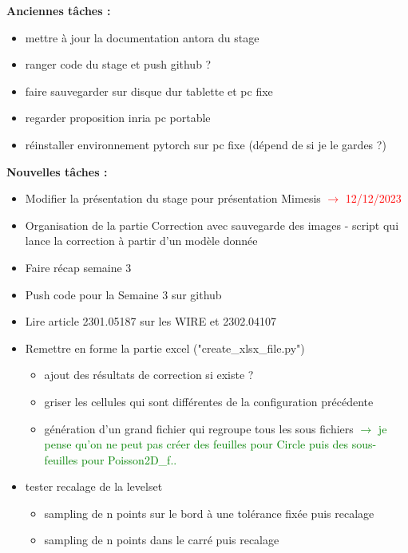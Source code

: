 \textbf{Anciennes tâches :}

\begin{itemize}[label=$\square$]
	\item mettre à jour la documentation antora du stage
	\item ranger code du stage et push github ?
	\item faire sauvegarder sur disque dur tablette et pc fixe
	\item regarder proposition inria pc portable
	\item réinstaller environnement pytorch sur pc fixe (dépend de si je le gardes ?)
\end{itemize}

\textbf{Nouvelles tâches :}

\begin{itemize}[label=$\square$]
	\item Modifier la présentation du stage pour présentation Mimesis \textcolor{red}{$\rightarrow$ 12/12/2023}
	\item[\done] Organisation de la partie Correction avec sauvegarde des images - script qui lance la correction à partir d'un modèle donnée
	\item[\done] Faire récap semaine 3
	\item[\done] Push code pour la Semaine 3 sur github
	\item[\done] Lire article 2301.05187 sur les WIRE et 2302.04107
	\item[\done] Remettre en forme la partie excel ("create\_xlsx\_file.py")
	\begin{itemize}[label=\LARGE $\circ$]
		\item[\sdone] ajout des résultats de correction si existe ?
		\item[\sdone] griser les cellules qui sont différentes de la configuration précédente
		\item[\swontfix] génération d'un grand fichier qui regroupe tous les sous fichiers \textcolor{Green}{$\rightarrow$ je pense qu'on ne peut pas créer des feuilles pour Circle puis des sous-feuilles pour Poisson2D\_f..}		
	\end{itemize}
	\item tester recalage de la levelset
	\begin{itemize}[label=\LARGE $\circ$]
		\item[\sdone] sampling de n points sur le bord à une tolérance fixée puis recalage
		\item sampling de n points dans le carré puis recalage
	\end{itemize}

\end{itemize}
